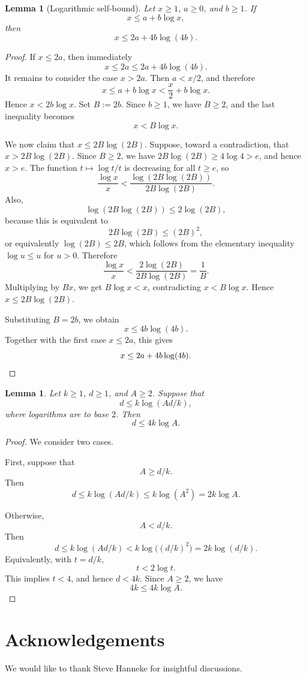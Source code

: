 \documentclass[11pt]{article}
\theoremstyle{plain}
\newtheorem{lemma}[theorem]{Lemma}
\theoremstyle{definition}
\theoremstyle{remark}
\begin{document}
\begin{lemma}[Logarithmic self-bound]
\label{lem:log-self-bound}
Let \(x\ge 1\), \(a\ge 0\), and \(b\ge 1\). If
\[
  x\le a+b\log x,
\]
then
\[
  x\le 2a+4b\log(4b).
\]
\end{lemma}

\begin{proof}
If \(x\le 2a\), then immediately
\[
  x\le 2a\le 2a+4b\log(4b).
\]
It remains to consider the case \(x>2a\). Then \(a<x/2\), and therefore
\[
  x\le a+b\log x
  <
  \frac{x}{2}+b\log x.
\]
Hence \(x<2b\log x\). Set \(B:=2b\). Since \(b\ge 1\), we have
\(B\ge 2\), and the last inequality becomes
\[
  x<B\log x.
\]

We now claim that \(x\le 2B\log(2B)\). Suppose, toward a contradiction,
that \(x>2B\log(2B)\). Since \(B\ge 2\), we have
\(2B\log(2B)\ge 4\log 4>e\), and hence \(x>e\). The function
\(t\mapsto \log t/t\) is decreasing for all \(t\ge e\), so
\[
  \frac{\log x}{x}
  <
  \frac{\log(2B\log(2B))}{2B\log(2B)}.
\]
Also,
\[
  \log(2B\log(2B))\le 2\log(2B),
\]
because this is equivalent to
\[
  2B\log(2B)\le (2B)^2,
\]
or equivalently \(\log(2B)\le 2B\), which follows from the elementary
inequality \(\log u\le u\) for \(u>0\). Therefore
\[
  \frac{\log x}{x}
  <
  \frac{2\log(2B)}{2B\log(2B)}
  =
  \frac1B.
\]
Multiplying by \(B x\), we get \(B\log x<x\), contradicting
\(x<B\log x\). Hence \(x\le 2B\log(2B)\).

Substituting \(B=2b\), we obtain
\[
  x\le 4b\log(4b).
\]
Together with the first case \(x\le 2a\), this gives
\[
  x\le 2a+4b\log(4b). \qedhere
\]
\end{proof}

\begin{lemma}
\label{lemma:vc-consistency}
Let \(k\ge 1\), \(d\ge 1\), and \(A\ge 2\). Suppose that
\[
  d \le k\log(Ad/k),
\]
where logarithms are to base \(2\). Then
\[
d \le 4k\log A.
\]
\end{lemma}

\begin{proof}
We consider two cases.

First, suppose that
\[
  A \ge d/k .
\]
Then
\[
  d \le k\log(Ad/k)
  \le k\log(A^2)
  =
  2k\log A .
\]

Otherwise,
\[
  A < d/k .
\]
Then
\[
  d \le k\log(Ad/k)
  <
  k\log\bigl((d/k)^2\bigr)
  =
  2k\log(d/k).
\]
Equivalently, with \(t=d/k\),
\[
  t < 2\log t .
\]
This implies \(t<4\), and hence \(d<4k\). Since \(A\ge 2\), we have
\[
  4k \le 4k\log A .
\]

\end{proof}


\section*{Acknowledgements}

We would like to thank Steve Hanneke for insightful discussions.




\newpage


\appendix
\end{document}
